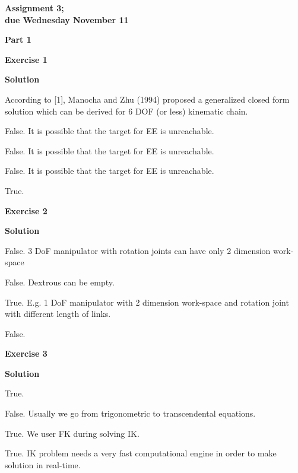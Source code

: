 \documentclass[12pt]{article}
\begin{document}


\begin{center}
\textbf{Assignment 3;\\
due Wednesday November 11}
\end{center}

\textbf{Part 1}	

\bigskip
	
\textbf{Exercise 1}		
		
\textbf{Solution}

\medskip


According to [1], Manocha and Zhu (1994) proposed a generalized closed form solution which can be derived for 6 DOF (or less) kinematic chain.

\begin{list}{()~}{}
\item False. It is possible that the target for EE is unreachable.
\item False. It is possible that the target for EE is unreachable.
\item False. It is possible that the target for EE is unreachable.
\item True.
\end{list}

\textbf{Exercise 2}		
		
\textbf{Solution}

\medskip

\begin{list}{()~}{}
\item False. 3 DoF manipulator with rotation joints can have only 2 dimension work-space
\item False. Dextrous can be empty.
\item True. E.g. 1 DoF manipulator with 2 dimension work-space and rotation joint with different length of links.
\item False.
\end{list}

\textbf{Exercise 3}		
		
\textbf{Solution}

\medskip

\begin{list}{()~}{}
\item True.
\item False. Usually we go from trigonometric to transcendental equations.
\item True. We user FK during solving IK.
\item True. IK problem needs a very fast computational engine in order to make solution in real-time.
\end{list}
\end{document}
